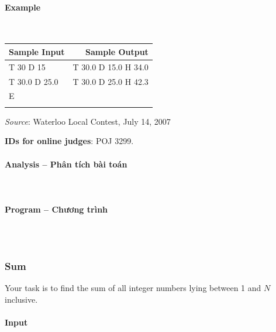 \documentclass{article}
\begin{document}
\paragraph{Example}\mbox{} \\

\begin{table}[h]
    \centering
    \begin{tabular}{|l|r|}
        \hline
        \textbf{Sample Input} & \textbf{Sample Output} \\
        \hline
         T 30 D 15   & T 30.0 D 15.0 H 34.0  \\ 
         T 30.0 D 25.0   & T 30.0 D 25.0 H 42.3 \\ 
         E   &  \\ 
            &  \\ \hline
    \end{tabular}
\end{table}

\textit{Source}: Waterloo Local Contest, July 14, 2007

\textbf{IDs for online judges}: POJ 3299.


\paragraph{Analysis -- Phân tích bài toán} \mbox{} \\


\paragraph{Program -- Chương trình} \mbox{} \\


\begin{lstlisting}

\end{lstlisting}




\subsubsection{Sum}

Your task is to find the sum of all integer numbers lying between 1 and $N$ inclusive.

\paragraph{Input} \mbox{} \\
\end{document}
